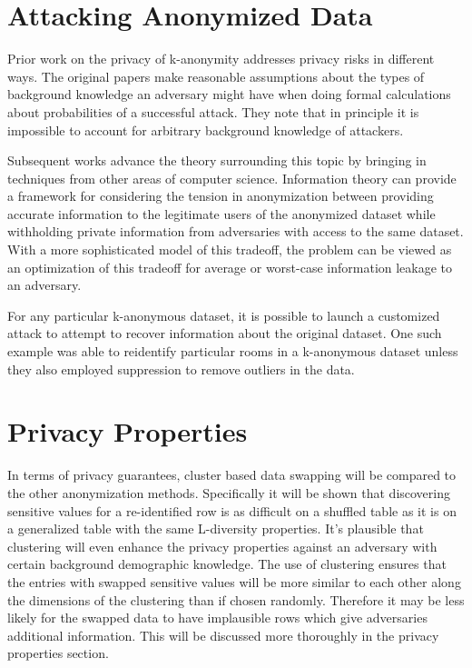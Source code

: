 \section{Attacking Anonymized Data}
Prior work on the privacy of k-anonymity addresses privacy risks in different ways. The original papers make reasonable assumptions about the types of background knowledge an adversary might have when doing formal calculations about probabilities of a successful attack. They note that in principle it is impossible to account for arbitrary background knowledge of attackers.

Subsequent works advance the theory surrounding this topic by bringing in techniques from other areas of computer science. Information theory can provide a framework for considering the tension in anonymization between providing accurate information to the legitimate users of the anonymized dataset while withholding private information from adversaries with access to the same dataset\cite{liuInfoTheory}. With a more sophisticated model of this tradeoff, the problem can be viewed as an optimization of this tradeoff for average or worst-case information leakage to an adversary\cite{duInfoTheory}.

For any particular k-anonymous dataset, it is possible to launch a customized attack to attempt to recover information about the original dataset. One such example \cite{schweeEval} was able to reidentify particular rooms in a k-anonymous dataset unless they also employed suppression to remove outliers in the data.

\section{Privacy Properties}
In terms of privacy guarantees, cluster based data swapping will be compared to the other anonymization methods. Specifically it will be shown that discovering sensitive values for a re-identified row is as difficult on a shuffled table as it is on a generalized table with the same L-diversity properties. It’s plausible that clustering will even enhance the privacy properties against an adversary with certain background demographic knowledge. The use of clustering ensures that the entries with swapped sensitive values will be more similar to each other along the dimensions of the clustering than if chosen randomly. Therefore it may be less likely for the swapped data to have implausible rows which give adversaries additional information. This will be discussed more thoroughly in the privacy properties section.

